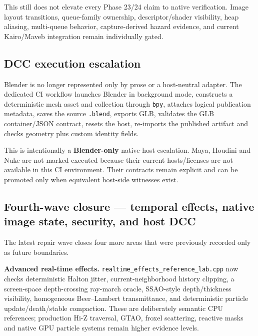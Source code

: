 This still does not elevate every Phase 23/24 claim to native verification. Image layout transitions, queue-family ownership, descriptor/shader visibility, heap aliasing, multi-queue behavior, capture-derived hazard evidence, and current Kairo/Maveb integration remain individually gated.

\subsection{DCC execution escalation}\label{appendix-2358b21a702d-dcc-execution-escalation}

\hypertarget{appendix-2358b21a702d-dcc-execution-escalation}{}

Blender is no longer represented only by prose or a host-neutral adapter. The dedicated CI workflow launches Blender in background mode, constructs a deterministic mesh asset and collection through \texttt{bpy}, attaches logical publication metadata, saves the source \texttt{.blend}, exports GLB, validates the GLB container/JSON contract, resets the host, re-imports the published artifact and checks geometry plus custom identity fields.

This is intentionally a \textbf{Blender-only} native-host escalation. Maya, Houdini and Nuke are not marked executed because their current hosts/licenses are not available in this CI environment. Their contracts remain explicit and can be promoted only when equivalent host-side witnesses exist.

\subsection{Fourth-wave closure --- temporal effects, native image state, security, and host DCC}\label{appendix-2358b21a702d-fourth-wave-closure-temporal-effects-native-image-state-security-and-host-dcc}

\hypertarget{appendix-2358b21a702d-fourth-wave-closure-temporal-effects-native-image-state-security-and-host-dcc}{}

The latest repair wave closes four more areas that were previously recorded only as future boundaries.

\textbf{Advanced real-time effects.} \texttt{realtime\_effects\_reference\_lab.cpp} now checks deterministic Halton jitter, current-neighborhood history clipping, a screen-space depth-crossing ray-march oracle, SSAO-style depth/thickness visibility, homogeneous Beer--Lambert transmittance, and deterministic particle update/death/stable compaction. These are deliberately semantic CPU references; production Hi-Z traversal, GTAO, froxel scattering, reactive masks and native GPU particle systems remain higher evidence levels.


